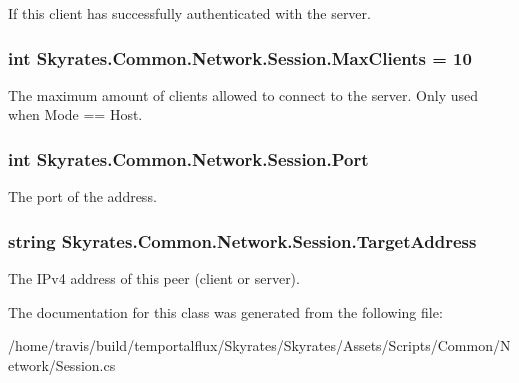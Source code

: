 If this client has successfully authenticated with the server. 

\hypertarget{class_skyrates_1_1_common_1_1_network_1_1_session_a4d9934f0f98f603daf947afacf49d3fb}{
\subsubsection[{Max\-Clients}]{\setlength{\rightskip}{0pt plus 5cm}int Skyrates.\-Common.\-Network.\-Session.\-Max\-Clients = 10}}\label{class_skyrates_1_1_common_1_1_network_1_1_session_a4d9934f0f98f603daf947afacf49d3fb}


The maximum amount of clients allowed to connect to the server. Only used when Mode == Host. 

\hypertarget{class_skyrates_1_1_common_1_1_network_1_1_session_aed90ad75336095fa3287c961aba40c7b}{
\subsubsection[{Port}]{\setlength{\rightskip}{0pt plus 5cm}int Skyrates.\-Common.\-Network.\-Session.\-Port}}\label{class_skyrates_1_1_common_1_1_network_1_1_session_aed90ad75336095fa3287c961aba40c7b}


The port of the address. 

\hypertarget{class_skyrates_1_1_common_1_1_network_1_1_session_a6d550a6d31777ca6d1d6dfba00c7955b}{
\subsubsection[{Target\-Address}]{\setlength{\rightskip}{0pt plus 5cm}string Skyrates.\-Common.\-Network.\-Session.\-Target\-Address}}\label{class_skyrates_1_1_common_1_1_network_1_1_session_a6d550a6d31777ca6d1d6dfba00c7955b}


The I\-Pv4 address of this peer (client or server). 



The documentation for this class was generated from the following file\-:\begin{DoxyCompactItemize}
\item 
/home/travis/build/temportalflux/\-Skyrates/\-Skyrates/\-Assets/\-Scripts/\-Common/\-Network/Session.\-cs\end{DoxyCompactItemize}
